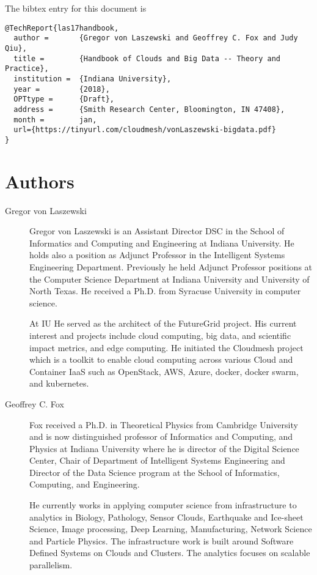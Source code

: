 \begin{enumerate}
The bibtex entry for this document is

\begin{verbatim}
@TechReport{las17handbook,
  author =       {Gregor von Laszewski and Geoffrey C. Fox and Judy Qiu},
  title =        {Handbook of Clouds and Big Data -- Theory and Practice},
  institution =  {Indiana University},
  year =         {2018},
  OPTtype =      {Draft},
  address =      {Smith Research Center, Bloomington, IN 47408},
  month =        jan,
  url={https://tinyurl.com/cloudmesh/vonLaszewski-bigdata.pdf} 
}
\end{verbatim}



\section{Authors}

\FILENAME

\begin{description}

\item[Gregor von Laszewski]  Gregor von
  Laszewski is an Assistant Director DSC in the School of Informatics
  and Computing and Engineering at Indiana University. He holds also a
  position as Adjunct Professor in the Intelligent Systems Engineering
  Department. Previously he held Adjunct Professor positions at the
  Computer Science Department at Indiana University and University of
  North Texas. He received a Ph.D. from Syracuse University in
  computer science.

  At IU He served as the architect of the FutureGrid project. His
  current interest and projects include cloud computing, big data, and
  scientific impact metrics, and edge computing.  He initiated the
  Cloudmesh project which is a toolkit to enable cloud computing
  across various Cloud and Container IaaS such as OpenStack, AWS,
  Azure, docker, docker swarm, and kubernetes.


\item[Geoffrey C. Fox]  Fox received a Ph.D. in
  Theoretical Physics from Cambridge University and is now
  distinguished professor of Informatics and Computing, and Physics at
  Indiana University where he is director of the Digital Science
  Center, Chair of Department of Intelligent Systems Engineering and
  Director of the Data Science program at the School of Informatics,
  Computing, and Engineering.

  He currently works in applying computer science from infrastructure
  to analytics in Biology, Pathology, Sensor Clouds, Earthquake and
  Ice-sheet Science, Image processing, Deep Learning, Manufacturing,
  Network Science and Particle Physics. The infrastructure work is
  built around Software Defined Systems on Clouds and Clusters. The
  analytics focuses on scalable parallelism.


\end{description}
\end{enumerate}
